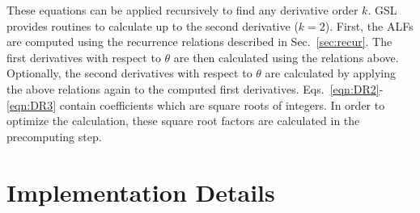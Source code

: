 \documentclass[12pt]{article}
\begin{document}
These equations can be applied recursively to find any derivative order
$k$. GSL provides routines to calculate up to the second derivative
($k=2$). First, the ALFs are computed using the recurrence relations
described in Sec.~\ref{sec:recur}. The first derivatives with respect
to $\theta$ are then calculated using the relations above. Optionally,
the second derivatives with respect to $\theta$ are calculated by
applying the above relations again to the computed first derivatives.
Eqs.~\eqref{eqn:DR2}-\eqref{eqn:DR3} contain coefficients which are
square roots of integers. In order to optimize the calculation, these
square root factors are calculated in the precomputing step.

\section{Implementation Details}
\end{document}
